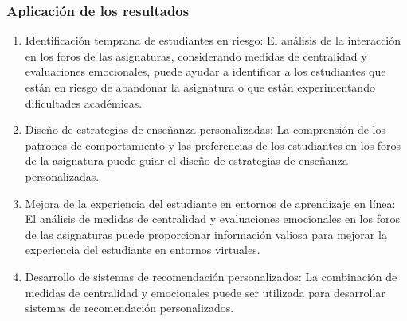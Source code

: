 \documentclass{beamer}
\begin{document}
\begin{frame}
	\frametitle{Aplicación de los resultados}
	
	\begin{enumerate}
		\item Identificación temprana de estudiantes en riesgo: El análisis de la interacción en los foros de las asignaturas, considerando medidas de centralidad y evaluaciones emocionales, puede ayudar a identificar a los estudiantes que están en riesgo de abandonar la asignatura o que están experimentando dificultades académicas.
		
		\item Diseño de estrategias de enseñanza personalizadas: La comprensión de los patrones de comportamiento y las preferencias de los estudiantes en los foros de la asignatura puede guiar el diseño de estrategias de enseñanza personalizadas.
		
		\item Mejora de la experiencia del estudiante en entornos de aprendizaje en línea: El análisis de medidas de centralidad y evaluaciones emocionales en los foros de las asignaturas puede proporcionar información valiosa para mejorar la experiencia del estudiante en entornos virtuales.
		
		\item Desarrollo de sistemas de recomendación personalizados: La combinación de medidas de centralidad y emocionales puede ser utilizada para desarrollar sistemas de recomendación personalizados.
	\end{enumerate}
\end{frame}


\begin{frame}[plain]
\large{\titlepage}
\end{frame}



%

%
\end{document}
